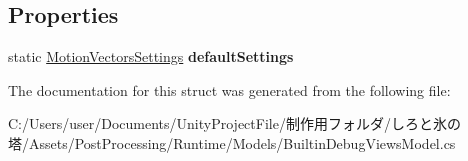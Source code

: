 \subsection*{Properties}
\begin{DoxyCompactItemize}
\item 
\mbox{\label{struct_unity_engine_1_1_post_processing_1_1_builtin_debug_views_model_1_1_motion_vectors_settings_a93b3d0cfc70da4574a94ed0ddd858250}} 
static \hyperlink{struct_unity_engine_1_1_post_processing_1_1_builtin_debug_views_model_1_1_motion_vectors_settings}{Motion\+Vectors\+Settings} {\bfseries default\+Settings}
\end{DoxyCompactItemize}


The documentation for this struct was generated from the following file\+:\begin{DoxyCompactItemize}
\item 
C\+:/\+Users/user/\+Documents/\+Unity\+Project\+File/制作用フォルダ/しろと氷の塔/\+Assets/\+Post\+Processing/\+Runtime/\+Models/Builtin\+Debug\+Views\+Model.\+cs\end{DoxyCompactItemize}
